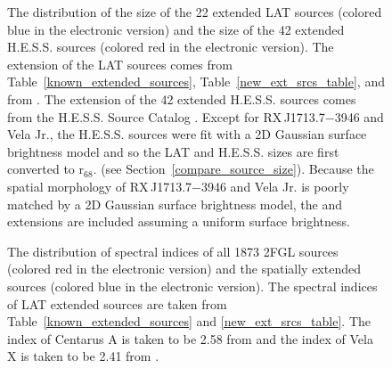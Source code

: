 \documentclass[12pt,preprint]{aastex}
\newif\ifcolorfigure
\newcommand{\gev}{\text{GeV}\xspace}
\newcommand{\tev}{\text{TeV}\xspace}
\newcommand{\rsixeight}{{\ensuremath{\text{r}_{68}}}\xspace}
\begin{document}
\clearpage
\begin{figure}
    \ifcolorfigure
      \plotone{summary_plots/gev_vs_tev_histogram_color.eps}
    \else
    \fi
    \caption{
    The distribution of the \gev size of the 22 extended LAT 
    sources (colored blue in the electronic version) and
    the \tev size of the 42 extended H.E.S.S. sources
    (colored red in the electronic version).
    The extension of the LAT sources comes from
    Table~\ref{known_extended_sources}, Table~\ref{new_ext_srcs_table},
    and from \cite{velax}. 
    The \tev extension of
    the 42 extended H.E.S.S. sources comes from the H.E.S.S. Source
    Catalog \citep{hesscat}.
    Except for RX\,J1713.7$-$3946 and Vela Jr.,
    the H.E.S.S. sources were fit with a 2D Gaussian surface
    brightness model and
    so the LAT and H.E.S.S. sizes are first converted to \rsixeight.
    (see Section~\ref{compare_source_size}). Because the spatial
    morphology of RX\,J1713.7$-$3946 and Vela Jr. is poorly matched by a
    2D Gaussian surface brightness model, the \gev and
    \tev extensions are included assuming a uniform surface brightness.
    }\label{gev_vs_tev_histogram}
  \end{figure}

\clearpage
\begin{figure}
    \ifcolorfigure
      \plotone{summary_plots/compare_index_2FGL_color.eps}
    \else
    \fi
    \caption{
    The distribution of spectral indices of all 1873 2FGL sources 
    (colored red in the electronic version)
    and the spatially extended sources (colored blue in the electronic
    version). The
    spectral indices of LAT extended sources are taken from
    Table~\ref{known_extended_sources} and \ref{new_ext_srcs_table}.
    The index of Centarus A is taken to be 2.58 from 
    \cite{second_cat} and the index of Vela X is taken to be 2.41
    from \cite{velax}. }\label{compare_index_2FGL}
  \end{figure}
\end{document}
